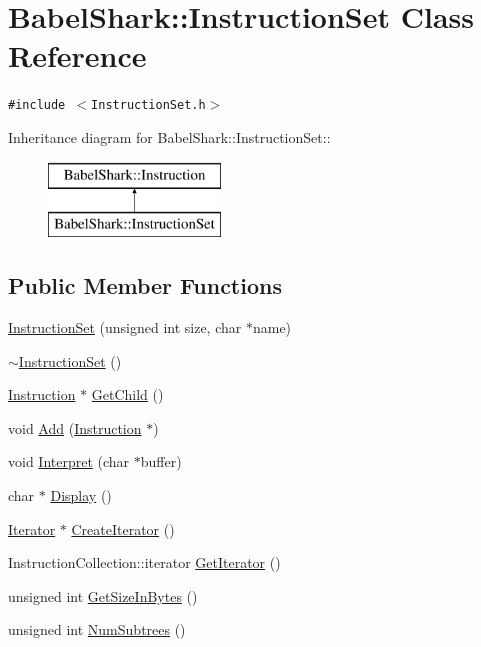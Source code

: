\hypertarget{class_babel_shark_1_1_instruction_set}{
\section{BabelShark::InstructionSet Class Reference}
\label{class_babel_shark_1_1_instruction_set}
}
{\tt \#include $<$InstructionSet.h$>$}

Inheritance diagram for BabelShark::InstructionSet::\begin{figure}[H]
\begin{center}
\leavevmode
\includegraphics[height=2cm]{class_babel_shark_1_1_instruction_set}
\end{center}
\end{figure}
\subsection*{Public Member Functions}
\begin{CompactItemize}
\item 
\hyperlink{class_babel_shark_1_1_instruction_set_b1d22c7566a5693c6cc44746a4a58d40}{InstructionSet} (unsigned int size, char $\ast$name)
\item 
\hyperlink{class_babel_shark_1_1_instruction_set_10f68c55831ae571354753c15487e8e0}{$\sim$InstructionSet} ()
\item 
\hyperlink{class_babel_shark_1_1_instruction}{Instruction} $\ast$ \hyperlink{class_babel_shark_1_1_instruction_set_3c5af90b398f3ec28bc4248630f87c63}{GetChild} ()
\item 
void \hyperlink{class_babel_shark_1_1_instruction_set_0e95013b914e2f4bdda8b0f94ab87712}{Add} (\hyperlink{class_babel_shark_1_1_instruction}{Instruction} $\ast$)
\item 
void \hyperlink{class_babel_shark_1_1_instruction_set_4d4c66b375e0f15de7775b295e15b558}{Interpret} (char $\ast$buffer)
\item 
char $\ast$ \hyperlink{class_babel_shark_1_1_instruction_set_8456f55059620a8a971b3f1f39d62fc0}{Display} ()
\item 
\hyperlink{class_babel_shark_1_1_iterator}{Iterator} $\ast$ \hyperlink{class_babel_shark_1_1_instruction_set_0ab5a7495470214060e64f9f7bc2ac72}{CreateIterator} ()
\item 
InstructionCollection::iterator \hyperlink{class_babel_shark_1_1_instruction_set_e6717a54fcb2da5282b52fbf506fa8bb}{GetIterator} ()
\item 
unsigned int \hyperlink{class_babel_shark_1_1_instruction_set_5f11c971baf5eba34cc825a65ab51ba9}{GetSizeInBytes} ()
\item 
unsigned int \hyperlink{class_babel_shark_1_1_instruction_set_663c141979af83f6b7e5188d0d105fad}{NumSubtrees} ()
\end{CompactItemize}


